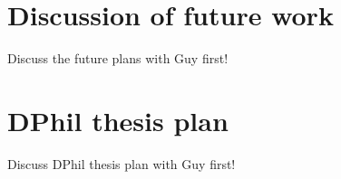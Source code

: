 \documentclass[12pt, a4paper, notitlepage, onecolumn]{article}
\numberwithin{equation}{section}
\begin{document}
\section{Discussion of future work}
\noindent Discuss the future plans with Guy first!





\newpage
\section{DPhil thesis plan}
\noindent Discuss DPhil thesis plan with Guy first!
\end{document}

